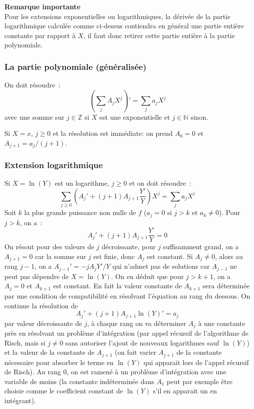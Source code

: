 \documentclass[a4paper,11pt]{article}
\newcommand{\Z}{{\mathbb{Z}}}
\newcommand{\N}{{\mathbb{N}}}
\begin{document}
{\bf Remarque importante}\\
Pour les extensions exponentielles ou logarithmiques, 
la d\'eriv\'ee de la partie logarithmique
calcul\'ee comme ci-dessus contiendra en g\'en\'eral 
une partie enti\`ere constante par rapport \`a $X$, il faut
donc retirer cette partie enti\`ere \`a la partie polynomiale.

\subsubsection{La partie polynomiale (généralisée)}
On doit résoudre~:
\[ (\sum_j A_j X^j)'=\sum_j a_j X^j \]
avec une somme sur $j \in\Z$ si $X$ est une exponentielle et
$j\in \N$ sinon.

Si $X=x$, $j\geq 0$ et la résolution est immédiate: on prend $A_0=0$ et 
$A_{j+1}=a_{j}/(j+1)$.

\subsubsection{Extension logarithmique}
Si $X=\ln(Y)$ est un logarithme, $j \geq 0$ et on doit résoudre~:
\[ \sum_{j\geq 0} (A_j'+(j+1)A_{j+1} \frac{Y'}{Y}) X^j = \sum_j a_j X^j \]
Soit $k$ la plus grande puissance non nulle de $f$ ($a_j=0$ 
si $j>k$ et $a_k\neq 0$). Pour $j>k$, on a~:
\[ A_j'+(j+1)A_{j+1} \frac{Y'}{Y}  =0 \]
On résout pour des valeurs de $j$ décroissante, pour $j$ suffisamment
grand, on a $A_{j+1}=0$ car la somme sur $j$ est finie, donc $A_j$
est constant. Si $A_j \neq 0$, alors au rang $j-1$, on a 
$A_{j-1} ' = -j A_j Y'/Y $ qui n'admet pas de solutions car 
$A_{j-1}$ ne peut pas dépendre de $X=\ln(Y)$. On en déduit que pour
$j>k+1$, on a $A_j=0$ et $A_{k+1}$ est constant. En fait la
valeur constante de $A_{k+1}$ sera déterminée par une condition
de compatibilité en résolvant l'équation au rang du dessous.
On continue la résolution de 
\[ A_j'+(j+1)A_{j+1} \ln(Y)'  = a_j \]
par valeur décroissante de $j$, à chaque
rang on va déterminer $A_j$ à une constante près en résolvant
un problème d'intégration (par appel récursif de l'algorithme
de Risch, mais si $j \neq 0$ sans autoriser l'ajout de nouveaux 
logarithmes sauf $\ln(Y)$)
et la valeur de la constante de $A_{j+1}$ (on fait varier $A_{j+1}$
de la constante nécessaire pour absorber le terme en $\ln(Y)$
qui apparait lors de l'appel récursif de Risch).
Au rang 0, on est ramené à un problème d'intégration avec
une variable de moins (la constante
indéterminée dans $A_1$ peut par exemple être choisie comme
le coefficient constant de $\ln(Y)$ s'il en apparait un en intégrant).
\end{document}
